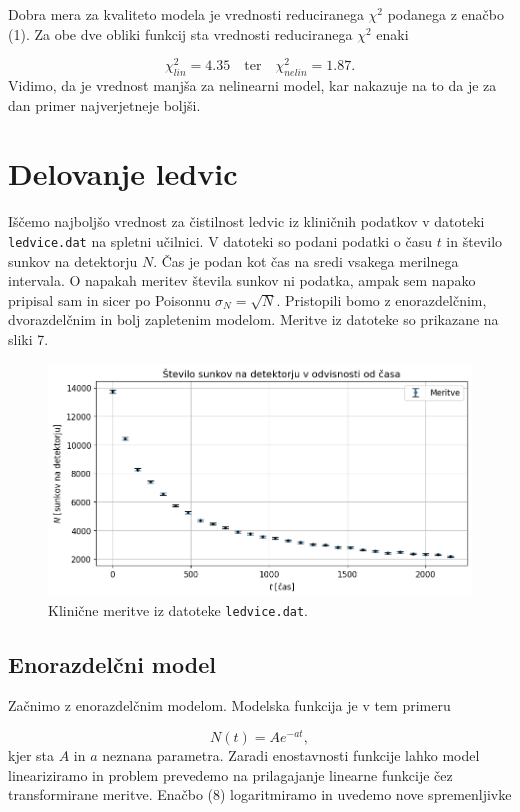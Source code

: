 \documentclass[slovene,11pt,a4paper]{article}
\begin{document}
Dobra mera za kvaliteto modela je vrednosti reduciranega $\chi^2$ podanega z enačbo (1). Za obe dve obliki funkcij sta vrednosti reduciranega $\chi^2$ enaki
 
\[
\chi^2_{lin} = 4.35 \quad \text{ter} \quad \chi^2_{nelin} = 1.87.
\]
Vidimo, da je vrednost manjša za nelinearni model, kar nakazuje na to da je za dan primer najverjetneje boljši.

\section{Delovanje ledvic}

Iščemo najboljšo vrednost za čistilnost ledvic iz kliničnih podatkov v datoteki \texttt{ledvice.dat} na spletni učilnici. V datoteki so podani podatki o času $t$ in število sunkov na detektorju $N$. Čas je podan kot čas na sredi vsakega merilnega intervala. O napakah meritev števila sunkov ni podatka, ampak sem napako pripisal sam in sicer po Poisonnu $\sigma_N = \sqrt{N}$. Pristopili bomo z enorazdelčnim, dvorazdelčnim in bolj zapletenim modelom. Meritve iz datoteke so prikazane na sliki 7.

\begin{figure}[h!]
\centering
\includegraphics[width=13cm]{ledvice1.png}
\caption{Klinične meritve iz datoteke \texttt{ledvice.dat}.}
\end{figure}

\subsection{Enorazdelčni model}

Začnimo z enorazdelčnim modelom. Modelska funkcija je v tem primeru 

\begin{equation}
N(t) = Ae^{-at},
\end{equation}
kjer sta $A$ in $a$ neznana parametra. Zaradi enostavnosti funkcije lahko model lineariziramo in problem prevedemo na prilagajanje linearne funkcije čez transformirane meritve. Enačbo (8) logaritmiramo in uvedemo nove spremenljivke
\end{document}
